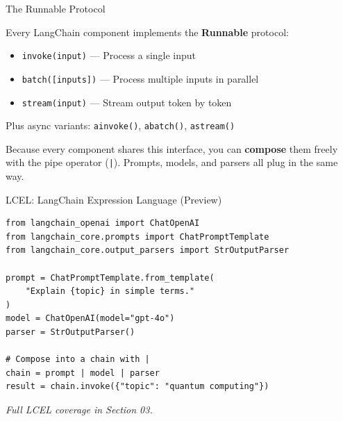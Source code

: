 \documentclass[aspectratio=169,11pt]{beamer}
\begin{document}
\begin{frame}{The Runnable Protocol}

\begin{conceptbox}
Every LangChain component implements the \textbf{Runnable} protocol:
\begin{itemize}\setlength{\itemsep}{1pt}
  \item \texttt{invoke(input)} --- Process a single input
  \item \texttt{batch([inputs])} --- Process multiple inputs in parallel
  \item \texttt{stream(input)} --- Stream output token by token
\end{itemize}
Plus async variants: \texttt{ainvoke()}, \texttt{abatch()}, \texttt{astream()}
\end{conceptbox}

\vspace{0.15cm}

\begin{tipbox}
Because every component shares this interface, you can \textbf{compose} them freely with the pipe operator (\texttt{|}). Prompts, models, and parsers all plug in the same way.
\end{tipbox}
\end{frame}

\begin{frame}[fragile]{LCEL: LangChain Expression Language (Preview)}

\begin{codebox}
\begin{lstlisting}
from langchain_openai import ChatOpenAI
from langchain_core.prompts import ChatPromptTemplate
from langchain_core.output_parsers import StrOutputParser

prompt = ChatPromptTemplate.from_template(
    "Explain {topic} in simple terms."
)
model = ChatOpenAI(model="gpt-4o")
parser = StrOutputParser()

# Compose into a chain with |
chain = prompt | model | parser
result = chain.invoke({"topic": "quantum computing"})
\end{lstlisting}
\end{codebox}

\vspace{0.1cm}
\textit{Full LCEL coverage in Section 03.}
\end{frame}
\end{document}
